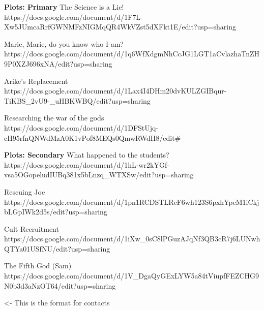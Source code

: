 \documentclass[char]{GL2020}
\begin{document}
\textbf{Plots: Primary}
The Science is a Lie!
https://docs.google.com/document/d/1F7L-Xw5JUmcaRrfGWNMFzNIGMqQR4WkVZst5dXFkt1E/edit?usp=sharing

Marie, Marie, do you know who I am?
https://docs.google.com/document/d/1q6WfXdgmNhCcJG1LGT1aCvlazhaTnZH9P0XZJ696xNA/edit?usp=sharing

Arike's Replacement
https://docs.google.com/document/d/1Lax4I4DHm20dvKULZGIBqur-TiKBS_2vU9-_uHBKWBQ/edit?usp=sharing

Researching the war of the gods
https://docs.google.com/document/d/1DFStUjq-cH95rfnQNWdMzA0K1vPof8MEQs0QmwRWdH8/edit#

\textbf{Plots: Secondary}
What happened to the students?
https://docs.google.com/document/d/1hL-wr2kYGf-vsa5OGopeludIUBq381x5bLnzq_WTXSw/edit?usp=sharing

Rescuing Joe
https://docs.google.com/document/d/1pn1RCDSTLRcF6wh123S6pxhYpeM1iCkjbLGpIWk2d5s/edit?usp=sharing

Cult Recruitment
https://docs.google.com/document/d/1iXw_0sC8lPGuzAJqNf3QB3cR7j6LUNwhQTYa01USfNU/edit?usp=sharing

The Fifth God (Sam)
https://docs.google.com/document/d/1V_DgaQyGExLYW5a84tViupfFEZCHG9N0b3d3aNzOT64/edit?usp=sharing

\begin{itemz}[Goals]
	\item 
\end{itemz}

\begin{itemz}[Notes]
	\item 
\end{itemz}

\begin{contacts}
	\contact{\cTest{}} <- This is the format for contacts 
\end{contacts}
\end{document}
